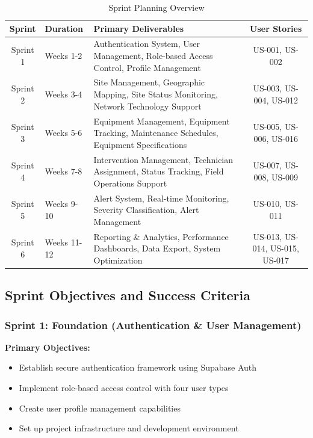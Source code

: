 \begin{table}[H]
\centering
\begin{tabular}{|c|p{2.5cm}|p{8cm}|c|}
\hline
\textbf{Sprint} & \textbf{Duration} & \textbf{Primary Deliverables} & \textbf{User Stories} \\
\hline
Sprint 1 & Weeks 1-2 & Authentication System, User Management, Role-based Access Control, Profile Management & US-001, US-002 \\
\hline
Sprint 2 & Weeks 3-4 & Site Management, Geographic Mapping, Site Status Monitoring, Network Technology Support & US-003, US-004, US-012 \\
\hline
Sprint 3 & Weeks 5-6 & Equipment Management, Equipment Tracking, Maintenance Schedules, Equipment Specifications & US-005, US-006, US-016 \\
\hline
Sprint 4 & Weeks 7-8 & Intervention Management, Technician Assignment, Status Tracking, Field Operations Support & US-007, US-008, US-009 \\
\hline
Sprint 5 & Weeks 9-10 & Alert System, Real-time Monitoring, Severity Classification, Alert Management & US-010, US-011 \\
\hline
Sprint 6 & Weeks 11-12 & Reporting \& Analytics, Performance Dashboards, Data Export, System Optimization & US-013, US-014, US-015, US-017 \\
\hline
\end{tabular}
\caption{Sprint Planning Overview}
\label{tab:sprint_planning}
\end{table}

\subsection{Sprint Objectives and Success Criteria}

\subsubsection{Sprint 1: Foundation (Authentication \& User Management)}
\textbf{Primary Objectives:}
\begin{itemize}
\item Establish secure authentication framework using Supabase Auth
\item Implement role-based access control with four user types
\item Create user profile management capabilities
\item Set up project infrastructure and development environment
\end{itemize}

